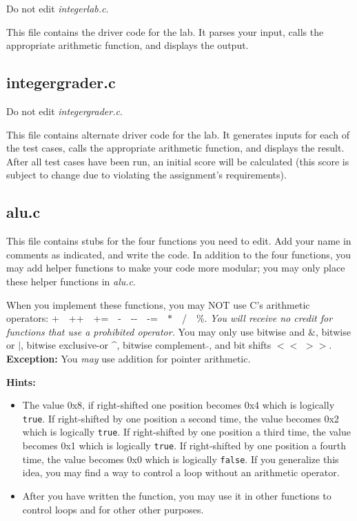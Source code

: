 Do not edit \textit{integerlab.c}.

This file contains the driver code for the lab.  It parses your input, calls
the appropriate arithmetic function, and displays the output.

\subsection{integergrader.c}

Do not edit \textit{integergrader.c}.

This file contains alternate driver code for the lab.  It generates inputs for
each of the test cases, calls the appropriate arithmetic function, and displays
the result. After all test cases have been run, an initial score will be
calculated (this score is subject to change due to violating the assignment's
requirements).

\subsection{alu.c}

This file contains stubs for the four functions you need to edit.  Add your
name in comments as indicated, and write the code.  In addition to the four
functions, you may add helper functions to make your code more modular; you may
only place these helper functions in \textit{alu.c}.

When you implement these functions, you may NOT use C's arithmetic operators:
+\ \ ++\ \ +=\ \ -\ \ -{}-\ \ -=\ \ $*$\ \ /\ \ \%.  \textit{You will receive
no credit for functions that use a prohibited operator.}  You may only use
bitwise and $\&$, bitwise or $|$, bitwise exclusive-or \^{ }, bitwise
complement $\tilde{ }$, and bit shifts $<<$ $>>$. \textbf{Exception:} You
\textit{may} use addition for pointer arithmetic.

\textbf{Hints:}
\begin{itemize}
\item The value 0x8, if right-shifted one position becomes 0x4 which is
    logically \lstinline{true}. If right-shifted by one position a second time,
    the value becomes 0x2 which is logically \lstinline{true}. If right-shifted
    by one position a third time, the value becomes 0x1 which is logically
    \lstinline{true}. If right-shifted by one position a fourth time, the value
    becomes 0x0 which is logically \lstinline{false}. If you generalize this
    idea, you may find a way to control a loop without an arithmetic operator.
\item After you have written the  function, you may use it in
    other functions to control loops and for other other purposes.
\end{itemize}

